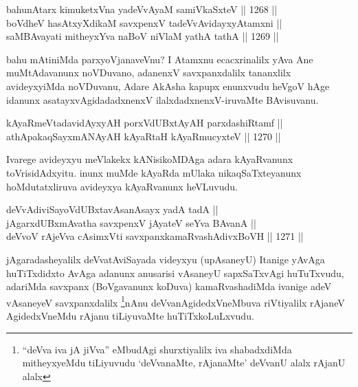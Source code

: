 \begin{shl}
bahunA\s tarx kimuketxVna yadeVvAyaM samiVkaSxteV \hfill || 1268 ||  \\
boVdheV hasAtxyXdikaM savxpenxV tadeVvAvidayxyA\s \s tamxni ||  \\
saMBAvayati mitheyxYva naBoV niVlaM yathA tathA \hfill || 1269 ||  
\end{shl}

\begin{artha}
bahu mAtiniMda parxyoVjanaveVnu? I Atamxnu ecacxrinalilx yAva Ane muMtAdavanunx noVDuvano, adanenxV savxpanxdalilx tananxlilx avideyxyiMda noVDuvanu, Adare AkAsha kapupx enunxvudu heVgoV hAge idanunx asatayxvAgidadadxnenxV ilalxdadxnenxV-iruvaMte BAvisuvanu.
\end{artha}


\begin{shl}
kAyaRmeVtadavidAyxyAH porxVdUBxtAyAH parxdashiRtamf || \\
athApakaqSayxmANAyAH kAyaRtaH kAyaRmucyxteV \hfill || 1270 ||  
\end{shl}

\begin{artha}
Ivarege avideyxyu meVlakekx kANisikoMDAga adara kAyaRvanunx toVrisidAdxyitu. inunx muMde kAyaRda mUlaka nikaqSaTxteyanunx hoMdutatxliruva avideyxya kAyaRvanunx heVLuvudu.
\end{artha}


\begin{shl}
deVvAdiviSayoVdUBxtavAsanA\s sayx yadA tadA || \\
jAgarxdUBxmAvatha savxpenxV jAyateV seYva BAvanA || \\
deVvoV rAjeVva cAsimxVti savxpanxkamaRvashAdivxBoVH \hfill || 1271 ||  
\end{shl}

\begin{artha}
jAgaradasheyalilx deVvatAviSayada videyxyu (upAsaneyU) Itanige yAvAga huTiTxdidxto AvAga adanunx anusarisi vAsaneyU sapxSaTxvAgi huTuTxvudu, adariMda savxpanx (BoVgavanunx koDuva) kamaRvashadiMda ivanige adeV vAsaneyeV savxpanxdalilx \footnote{``deVva iva jA jiVva'' eMbudAgi shurxtiyalilx iva shabadxdiMda mitheyxyeMdu tiLiyuvudu `deVvanaMte, rAjanaMte' deVvanU alalx rAjanU alalx}nAnu deVvanAgidedxVneMbuva riVtiyalilx rAjaneV AgidedxVneMdu rAjanu tiLiyuvaMte huTiTxkoLuLxvudu.
\end{artha}

